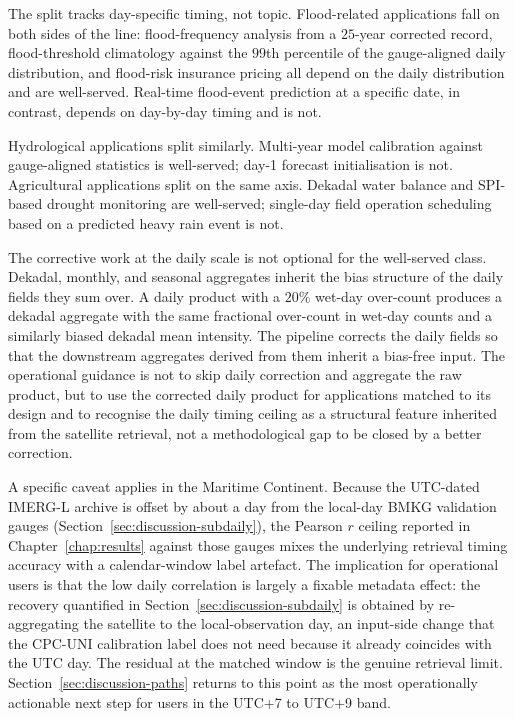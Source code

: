 The split tracks day-specific timing, not topic. Flood-related
applications fall on both sides of the line: flood-frequency
analysis from a $25$-year corrected record, flood-threshold
climatology against the $99$th percentile of the gauge-aligned
daily distribution, and flood-risk insurance pricing all depend
on the daily distribution and are well-served. Real-time
flood-event prediction at a specific date, in contrast, depends
on day-by-day timing and is not.

Hydrological applications split
similarly. Multi-year model calibration against gauge-aligned
statistics is well-served; day-1 forecast initialisation is not.
Agricultural applications split on the same axis. Dekadal water
balance and SPI-based drought monitoring are well-served;
single-day field operation scheduling based on a predicted heavy
rain event is not.

The corrective work at the daily scale is not optional for the
well-served class. Dekadal, monthly, and seasonal aggregates
inherit the bias structure of the daily fields they sum over. A
daily product with a $20\%$ wet-day over-count produces a
dekadal aggregate with the same fractional over-count in
wet-day counts and a similarly biased dekadal mean intensity.
The pipeline corrects the daily fields so that the downstream
aggregates derived from them inherit a bias-free input. The
operational guidance is not to skip daily correction and aggregate
the raw product, but to use the corrected daily product for
applications matched to its design and to recognise the daily
timing ceiling as a structural feature inherited from the
satellite retrieval, not a methodological gap to be closed by a
better correction.

A specific caveat applies in the Maritime Continent. Because the
UTC-dated IMERG-L archive is offset by about a day from the
local-day BMKG validation gauges \citep{ref:bmkg2006sk32}
(Section~\ref{sec:discussion-subdaily}), the Pearson $r$ ceiling
reported in Chapter~\ref{chap:results} against those gauges mixes
the underlying retrieval timing accuracy with a calendar-window
label artefact. The implication for operational users is that the
low daily correlation is largely a fixable metadata effect: the
recovery quantified in Section~\ref{sec:discussion-subdaily} is
obtained by re-aggregating the satellite to the local-observation
day, an input-side change that the CPC-UNI calibration label does
not need because it already coincides with the UTC day. The
residual at the matched window is the genuine retrieval limit.
Section~\ref{sec:discussion-paths} returns to this point as the
most operationally actionable next step for users in the UTC+7
to UTC+9 band.


